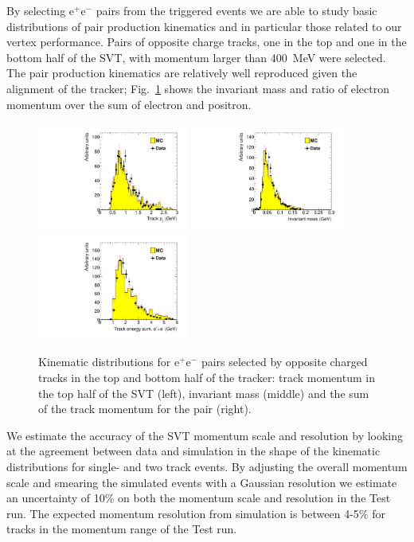 \documentclass[final,3p,times,twocolumn]{elsarticle}
\newcommand{\ee}{e$^+$e$^-$}
\begin{document}
By selecting \ee{} pairs from the triggered events we are able to study basic distributions of pair 
production kinematics and in particular those related to our vertex performance. Pairs of opposite charge 
tracks, one in the top and one in the bottom half of the SVT, with momentum larger than 400~MeV were 
selected. The pair production kinematics are relatively well reproduced given the alignment of the 
tracker; Fig.~\ref{fig:pair_kin} shows the invariant mass and ratio of electron momentum over the sum of 
electron and positron. 
 \begin{center}
{\small
\begin{figure}[t]
   \includegraphics[width=5cm]{figures/h_trk_top_px_h_trk_top_px_trigsel4hit_pair1351_twotrkfilt-v6-paper}
   \includegraphics[width=5cm]{figures/h_invM_h_invM_trigsel4hit_pair1351_twotrkfilt-v6-paper}
   \includegraphics[width=5cm]{figures/h_sumE_h_sumE_trigsel4hit_pair1351_twotrkfilt-v6-paper}
\caption{Kinematic distributions for e$^+$e$^-$ pairs selected by opposite charged tracks in the top and bottom half of the tracker: track momentum in the top half of the SVT (left), invariant mass (middle) and the sum of the track momentum for the pair (right).}
\label{fig:pair_kin}
\end{figure}
}
\end{center}
We estimate the accuracy of the SVT momentum scale and resolution by looking at the agreement 
between data and simulation in the shape of the kinematic distributions for single- and two track 
events.  By adjusting the overall momentum scale and smearing the simulated events with a 
Gaussian resolution we estimate an uncertainty of 10\% on both the momentum scale and 
resolution in the Test run. The expected momentum resolution from simulation is between 4-5\% 
for tracks in the momentum range of the Test run.
\end{document}
